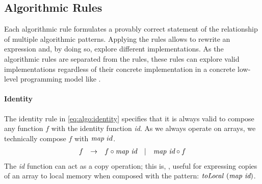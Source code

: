 
\newenvironment{rerule}[1]%
{\begin{equation}\begin{array}{#1}\ignorespaces}%
{\end{array}\end{equation}%
\ignorespacesafterend}

\newenvironment{rerule*}[1]%
{\begin{equation*}\begin{array}{#1}\ignorespaces}%
{\end{array}\end{equation*}%
\ignorespacesafterend}


\newcommand{\comment}[1] {%
\{\text{\small #1}\}%
}

\subsection{Algorithmic Rules}
\label{section:rules:algo}

Each algorithmic rule formulates a provably correct statement of the relationship of multiple algorithmic patterns.
Applying the rules allows to rewrite an expression and, by doing so, explore different implementations.
As the algorithmic rules are separated from the  \OpenCL rules, these rules can explore valid implementations regardless of their concrete implementation in a concrete low-level programming model like \OpenCL.

\paragraph{Identity}
The identity rule in \autoref{eq:algo:identity} specifies that it is always valid to compose any function $f$ with the identity function \emph{id}.
As we always operate on arrays, we technically compose $f$ with $\text{\textit{map}}\ id$.
%
\begin{rerule}{lclcl}
  f & \rightarrow & f \circ \map\ \textit{id} & | & \map\ \textit{id} \circ f
  \label{eq:algo:identity}
\end{rerule}
%
The \textit{id} function can act as a copy operation; this is, \eg, useful for expressing copies of an array to local memory when composed with the \toLocal \OpenCL pattern: $\text{\textit{toLocal}}\ (\text{\textit{map}}\ \textit{id})$.

